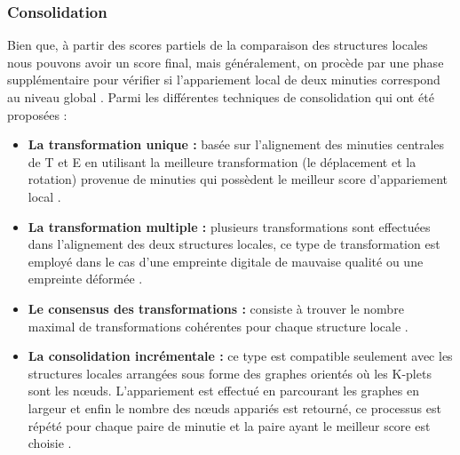 \subsubsection{Consolidation}
Bien que, à partir des scores partiels de la comparaison des structures locales nous pouvons avoir un score final, mais généralement, on procède par une phase supplémentaire pour vérifier si l'appariement local de deux minuties correspond au niveau global \citep{maltoni2009handbook}. Parmi les différentes techniques de consolidation qui ont été proposées :
\begin{itemize}
	\item \textbf{La transformation unique :} basée sur l'alignement des minuties centrales de T et E en utilisant la meilleure transformation (le déplacement et la rotation) provenue de minuties qui possèdent le meilleur score d'appariement local \citep{jiang2000fingerprint}.
	\item \textbf{La transformation multiple :} plusieurs transformations sont effectuées dans l'alignement des deux structures locales, ce type de transformation est employé dans le cas d'une empreinte digitale de mauvaise qualité ou une empreinte déformée \citep{maltoni2009handbook}.
	\item \textbf{Le consensus des transformations : }consiste à trouver le nombre maximal de transformations cohérentes pour chaque structure locale \citep{maltoni2009handbook}.
	\item \textbf{La consolidation incrémentale :} ce type est compatible seulement avec les structures locales arrangées sous forme des graphes orientés où les K-plets sont les nœuds. L'appariement est effectué en parcourant les graphes en largeur et enfin le nombre des nœuds appariés est retourné, ce processus est répété pour chaque paire de minutie et la paire ayant le meilleur score est choisie \citep{chikkerur2006k}.
\end{itemize}
